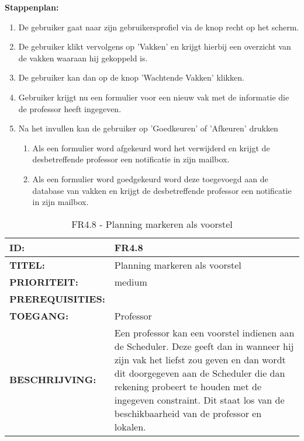 \textbf{Stappenplan:}
	\begin{enumerate}
	\item De gebruiker gaat naar zijn gebruikersprofiel via de knop recht op het scherm.
	\item De gebruiker klikt vervolgens op 'Vakken' en krijgt hierbij een overzicht van de vakken waaraan hij gekoppeld is.
	\item De gebruiker kan dan op de knop 'Wachtende Vakken' klikken.
	\item Gebruiker krijgt nu een formulier voor een nieuw vak met de informatie die de professor heeft ingegeven.
	\item Na het invullen kan de gebruiker op 'Goedkeuren' of 'Afkeuren' drukken
		\begin{enumerate}
		\item Als een formulier word afgekeurd word het verwijderd en krijgt de desbetreffende professor een notificatie in zijn mailbox.
		\item Als een formulier word goedgekeurd word deze toegevoegd aan de database van vakken en krijgt de desbetreffende professor een notificatie in zijn mailbox.
		\end{enumerate}
	\end{enumerate}       
         
        
\noindent\begin{table}[H]
            \begin{tabular}{l | p{10cm}}
                \textbf{ID:} & FR4.8 \\ \hline
                \textbf{TITEL:} & Planning markeren als voorstel\\ \hline
                \textbf{PRIORITEIT:} &  medium \\ \hline
                \textbf{PREREQUISITIES:} & \\ \hline
                \textbf{TOEGANG:} & Professor \\ \hline
                \textbf{BESCHRIJVING:} & Een professor kan een voorstel indienen aan de Scheduler. 
                                        Deze geeft dan in wanneer hij zijn vak het liefst zou geven en dan wordt dit doorgegeven aan de Scheduler die dan rekening probeert te houden met de ingegeven constraint. Dit staat los van de beschikbaarheid van de professor en lokalen.  \\
            \end{tabular}\\
            \caption{FR4.8 - Planning markeren als voorstel}
            \label{tab:FR4.8 - Planning markeren als voorstel}
        \end{table}
        

